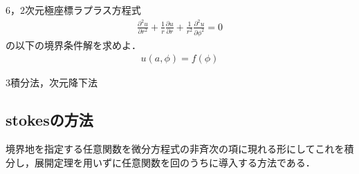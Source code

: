 \documentclass[a4j]{jarticle}
\begin{document}
6，$2$次元極座標ラプラス方程式\\
\begin{align*}
 \frac{\partial^2 u}{\partial r^2}+\frac{1}{r}\frac{\partial u}{\partial r}+\frac{1}{r^2}\frac{\partial^2 u}{\partial \phi^2}=0 
\end{align*}
の以下の境界条件解を求めよ．
\begin{align*}
 u(a,\phi)=f(\phi)
\end{align*}

3積分法，次元降下法


\subsection{stokesの方法}
境界地を指定する任意関数を微分方程式の非斉次の項に現れる形にしてこれを積分し，展開定理を用いずに任意関数を回のうちに導入する方法である．
\end{document}
